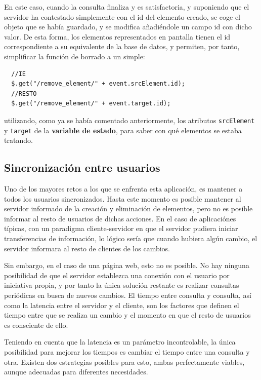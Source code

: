 En este caso, cuando la consulta finaliza y es satisfactoria, y suponiendo que el servidor ha contestado simplemente con el id del elemento creado, se coge el objeto que se había guardado, y se modifica añadiéndole un campo id con dicho valor. De esta forma, los elementos representados en pantalla tienen el id correspondiente a su equivalente de la base de datos, y permiten, por tanto, simplificar la función de borrado a un simple:

\begin{verbatim}
  //IE
  $.get("/remove_element/" + event.srcElement.id);
  //RESTO
  $.get("/remove_element/" + event.target.id);
\end{verbatim}

utilizando, como ya se había comentado anteriormente, los atributos \texttt{srcElement} y \texttt{target} de la \textbf{variable de estado}, para saber con qué elementos se estaba tratando.

\newpage
\subsection{Sincronización entre usuarios} %
\label{ssub:sincronizacion_entre_usuarios}

Uno de los mayores retos a los que se enfrenta esta aplicación, es mantener a todos los usuarios sincronizados. Hasta este momento es posible mantener al servidor informado de la creación y eliminación de elementos, pero no es posible informar al resto de usuarios de dichas acciones. En el caso de aplicaciónes típicas, con un paradigma cliente-servidor en que el servidor pudiera iniciar transferencias de información, lo lógico sería que cuando hubiera algún cambio, el servidor informara al resto de clientes de los cambios.

Sin embargo, en el caso de una página web, esto no es posible. No hay ninguna posibilidad de que el servidor establezca una conexión con el usuario por iniciativa propia, y por tanto la única solución restante es realizar consultas periódicas en busca de nuevos cambios. El tiempo entre consulta y consulta, así como la latencia entre el servidor y el cliente, son los factores que definen el tiempo entre que se realiza un cambio y el momento en que el resto de usuarios es consciente de ello.

Teniendo en cuenta que la latencia es un parámetro incontrolable, la única posibilidad para mejorar los tiempos es cambiar el tiempo entre una consulta y otra. Existen dos estrategias posibles para esto, ambas perfectamente viables, aunque adecuadas para diferentes necesidades.

